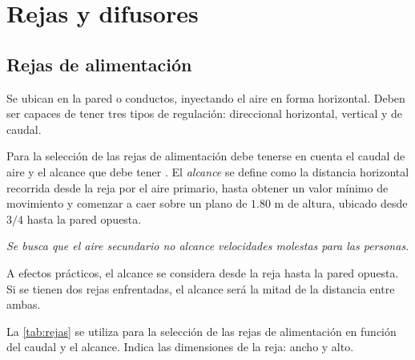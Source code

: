 \section{Rejas y difusores}

\subsection{Rejas de alimentación}

Se ubican en la pared o conductos, inyectando el aire en forma horizontal. Deben ser capaces de tener tres tipos de regulación: direccional horizontal, vertical y de caudal.


Para la selección de las rejas de alimentación debe tenerse en cuenta el caudal de aire y el alcance que debe tener \parencite{quadri2020instalaciones}. El \emph{alcance} se define como la distancia horizontal recorrida desde la reja por el aire primario, hasta obtener un valor mínimo de movimiento y comenzar a caer sobre un plano de $1.80$ m de altura, ubicado desde $3/4$ hasta la pared opuesta.


\emph{Se busca que el aire secundario no alcance velocidades molestas para las personas.}


A efectos prácticos, el alcance se considera desde la reja hasta la pared opuesta. Si se tienen dos rejas enfrentadas, el alcance será la mitad de la distancia entre ambas.

La \autoref{tab:rejas} se utiliza para la selección de las rejas de alimentación en función del caudal y el alcance. Indica las dimensiones de la reja: ancho y alto.

